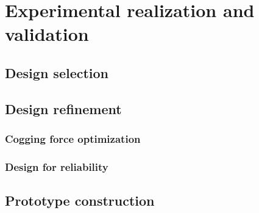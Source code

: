\chapter{Experimental realization and validation}   \label{Chapter:experiment}


\section{Design selection}                          \label{Chapter:experiment/design selection}


\section{Design refinement}                         \label{Chapter:experiment/design refinement}
    \subsection{Cogging force optimization}         \label{Chapter:experiment/design refinement/cogging force optimization}
    \subsection{Design for reliability}             \label{Chapter:experiment/design refinement/design for reliability}


\section{Prototype construction}                    \label{Chapter:experiment/prototype construction}


